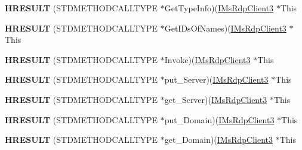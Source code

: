 \begin{DoxyCompactItemize}
{\bfseries H\+R\+E\+S\+U\+LT} (S\+T\+D\+M\+E\+T\+H\+O\+D\+C\+A\+L\+L\+T\+Y\+PE $\ast$Get\+Type\+Info)(\hyperlink{interface_m_s_t_s_c_lib_1_1_i_ms_rdp_client3}{I\+Ms\+Rdp\+Client3} $\ast$This
\item 
\mbox{\label{struct_m_s_t_s_c_lib_1_1_i_ms_rdp_client3_vtbl_af672a62c9a0eca176acdda2248d510b3}} 
{\bfseries H\+R\+E\+S\+U\+LT} (S\+T\+D\+M\+E\+T\+H\+O\+D\+C\+A\+L\+L\+T\+Y\+PE $\ast$Get\+I\+Ds\+Of\+Names)(\hyperlink{interface_m_s_t_s_c_lib_1_1_i_ms_rdp_client3}{I\+Ms\+Rdp\+Client3} $\ast$This
\item 
\mbox{\label{struct_m_s_t_s_c_lib_1_1_i_ms_rdp_client3_vtbl_a2795685d5885e6671f8c4f655a779e7d}} 
{\bfseries H\+R\+E\+S\+U\+LT} (S\+T\+D\+M\+E\+T\+H\+O\+D\+C\+A\+L\+L\+T\+Y\+PE $\ast$Invoke)(\hyperlink{interface_m_s_t_s_c_lib_1_1_i_ms_rdp_client3}{I\+Ms\+Rdp\+Client3} $\ast$This
\item 
\mbox{\label{struct_m_s_t_s_c_lib_1_1_i_ms_rdp_client3_vtbl_a857dfb36896238741a2d491ff151ce0b}} 
{\bfseries H\+R\+E\+S\+U\+LT} (S\+T\+D\+M\+E\+T\+H\+O\+D\+C\+A\+L\+L\+T\+Y\+PE $\ast$put\+\_\+\+Server)(\hyperlink{interface_m_s_t_s_c_lib_1_1_i_ms_rdp_client3}{I\+Ms\+Rdp\+Client3} $\ast$This
\item 
\mbox{\label{struct_m_s_t_s_c_lib_1_1_i_ms_rdp_client3_vtbl_a539fbe96eafee03a38387d869fe49dba}} 
{\bfseries H\+R\+E\+S\+U\+LT} (S\+T\+D\+M\+E\+T\+H\+O\+D\+C\+A\+L\+L\+T\+Y\+PE $\ast$get\+\_\+\+Server)(\hyperlink{interface_m_s_t_s_c_lib_1_1_i_ms_rdp_client3}{I\+Ms\+Rdp\+Client3} $\ast$This
\item 
\mbox{\label{struct_m_s_t_s_c_lib_1_1_i_ms_rdp_client3_vtbl_ac37dadc4fdae1eb00bf0d86fd7213bdd}} 
{\bfseries H\+R\+E\+S\+U\+LT} (S\+T\+D\+M\+E\+T\+H\+O\+D\+C\+A\+L\+L\+T\+Y\+PE $\ast$put\+\_\+\+Domain)(\hyperlink{interface_m_s_t_s_c_lib_1_1_i_ms_rdp_client3}{I\+Ms\+Rdp\+Client3} $\ast$This
\item 
\mbox{\label{struct_m_s_t_s_c_lib_1_1_i_ms_rdp_client3_vtbl_a6dd42b3a1ad0d17689fec709e1c3a4d3}} 
{\bfseries H\+R\+E\+S\+U\+LT} (S\+T\+D\+M\+E\+T\+H\+O\+D\+C\+A\+L\+L\+T\+Y\+PE $\ast$get\+\_\+\+Domain)(\hyperlink{interface_m_s_t_s_c_lib_1_1_i_ms_rdp_client3}{I\+Ms\+Rdp\+Client3} $\ast$This

\end{DoxyCompactItemize}
